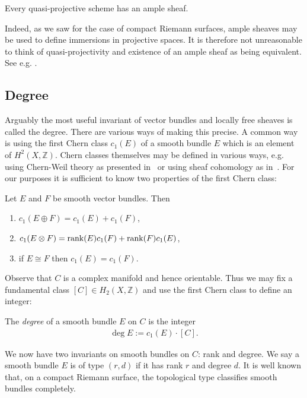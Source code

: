 \documentclass[12pt]{ociamthesis}  %
\begin{document}
\begin{corollary}
  Every quasi-projective scheme has an ample sheaf.
\end{corollary}

Indeed, as we saw for the case of compact Riemann surfaces, ample
sheaves may be used to define immersions in projective spaces. It is
therefore not unreasonable to think of quasi-projectivity and existence
of an ample sheaf as being equivalent. See e.g. 
\cite[\href{https://stacks.math.columbia.edu/tag/01VW}{Tag 01VW}]{stacks-project}.

\subsection{Degree}

Arguably the most useful invariant of vector bundles and locally
free sheaves is called the degree. There are various ways of
making this precise. A common way is using the first Chern
class $c_1(E)$ of a smooth bundle $E$ which is an element of $H^2(X,\mathbb Z)$.
Chern classes themselves may be defined in various ways, 
e.g. using Chern-Weil theory as presented in~\cite[Chapter 2]{fine2013}
or using sheaf cohomology as in~\cite{griffiths1994}. 
For our purposes it is sufficient to know two properties of
the first Chern class:

\begin{lemma}\label{lem:chern_classes}
  Let $E$ and $F$ be smooth vector bundles. Then
  \begin{enumerate}
    \item $c_1(E\oplus F) = c_1(E) + c_1(F)$,
    \item $c_1(E\otimes F) = \operatorname{rank}(E)c_1(F) + \operatorname{rank}(F) c_1(E)$,
    \item if $E\cong F$ then $c_1(E) = c_1(F)$.
  \end{enumerate}
\end{lemma}

Observe that $C$ is a complex manifold and hence orientable. 
Thus we may fix a fundamental class $[C]\in H_2(X,\mathbb Z)$
and use the first Chern class to define an integer:

\begin{definition}
  The \emph{degree} of a smooth bundle $E$ on $C$ is the integer
  \begin{align*}
    \deg E := c_1(E)\cdot[C].
  \end{align*}
\end{definition}

We now have two invariants on smooth bundles on $C$: rank and degree.
We say a smooth bundle $E$ is of type $(r,d)$ if it has rank $r$
and degree $d$. It is well known that, on a compact Riemann surface,
the topological type classifies smooth bundles completely. \cite{thaddeus2021}
\end{document}
